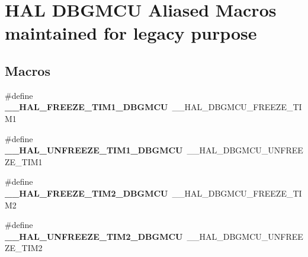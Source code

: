 \hypertarget{group___h_a_l___d_b_g_m_c_u___aliased___macros}{}\section{H\+AL D\+B\+G\+M\+CU Aliased Macros maintained for legacy purpose}
\label{group___h_a_l___d_b_g_m_c_u___aliased___macros}
\subsection*{Macros}
\begin{DoxyCompactItemize}
\item 
\mbox{\label{group___h_a_l___d_b_g_m_c_u___aliased___macros_gac0c5e626811757be9054cdeef7df4980}} 
\#define {\bfseries \+\_\+\+\_\+\+H\+A\+L\+\_\+\+F\+R\+E\+E\+Z\+E\+\_\+\+T\+I\+M1\+\_\+\+D\+B\+G\+M\+CU}~\+\_\+\+\_\+\+H\+A\+L\+\_\+\+D\+B\+G\+M\+C\+U\+\_\+\+F\+R\+E\+E\+Z\+E\+\_\+\+T\+I\+M1
\item 
\mbox{\label{group___h_a_l___d_b_g_m_c_u___aliased___macros_ga331504a5985db6b71dfbb29a4fc4d670}} 
\#define {\bfseries \+\_\+\+\_\+\+H\+A\+L\+\_\+\+U\+N\+F\+R\+E\+E\+Z\+E\+\_\+\+T\+I\+M1\+\_\+\+D\+B\+G\+M\+CU}~\+\_\+\+\_\+\+H\+A\+L\+\_\+\+D\+B\+G\+M\+C\+U\+\_\+\+U\+N\+F\+R\+E\+E\+Z\+E\+\_\+\+T\+I\+M1
\item 
\mbox{\label{group___h_a_l___d_b_g_m_c_u___aliased___macros_ga94f02b5b50bb79574876c05eb507607b}} 
\#define {\bfseries \+\_\+\+\_\+\+H\+A\+L\+\_\+\+F\+R\+E\+E\+Z\+E\+\_\+\+T\+I\+M2\+\_\+\+D\+B\+G\+M\+CU}~\+\_\+\+\_\+\+H\+A\+L\+\_\+\+D\+B\+G\+M\+C\+U\+\_\+\+F\+R\+E\+E\+Z\+E\+\_\+\+T\+I\+M2
\item 
\mbox{\label{group___h_a_l___d_b_g_m_c_u___aliased___macros_gaf710a524a97565d4a117321ce7a6571c}} 
\#define {\bfseries \+\_\+\+\_\+\+H\+A\+L\+\_\+\+U\+N\+F\+R\+E\+E\+Z\+E\+\_\+\+T\+I\+M2\+\_\+\+D\+B\+G\+M\+CU}~\+\_\+\+\_\+\+H\+A\+L\+\_\+\+D\+B\+G\+M\+C\+U\+\_\+\+U\+N\+F\+R\+E\+E\+Z\+E\+\_\+\+T\+I\+M2
\item 
\mbox{\label{group___h_a_l___d_b_g_m_c_u___aliased___macros_gab77737aff6c6ee212a5837dd7320c06b}} 

\end{DoxyCompactItemize}
